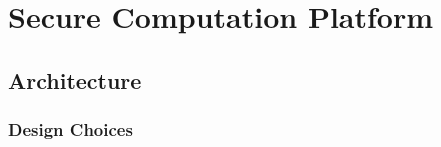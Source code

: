 
\chapter{Secure Computation Platform}
\label{ch:proposal}

\section{Architecture}
\label{sec:proposal:architecture}

\subsection{Design Choices}

